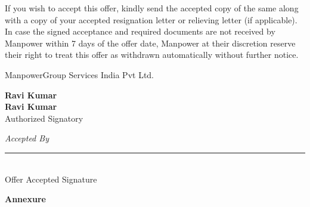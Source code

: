 \documentclass[a4paper,8pt]{article}
\begin{document}
If you wish to accept this offer, kindly send the accepted copy of the same along with a copy of your accepted resignation letter or relieving letter (if applicable). In case the signed acceptance and required documents are not received by Manpower within 7 days of the offer date, Manpower at their discretion reserve their right to treat this offer as withdrawn automatically without further notice.

\vspace{0.5cm}

ManpowerGroup Services India Pvt Ltd.


\vspace{1cm}

\begin{flushleft}


\textbf{Ravi Kumar}\\[0.3cm]



\textbf{Ravi Kumar}\\



Authorized Signatory\\




\end{flushleft} 

\vspace{2cm}

\begin{flushright}
\textit{Accepted By}

\vspace{2cm}

\rule{6cm}{0.5pt}\\
Offer Accepted Signature
\end{flushright}

\newpage

\begin{center}
\textbf{Annexure}
\end{center}

\vspace{0.5cm}

\end{document}
